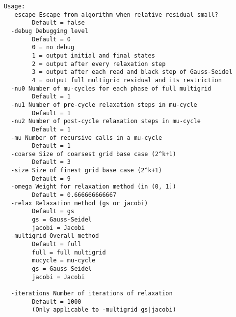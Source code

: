 \begin{verbatim}
Usage:
  -escape Escape from algorithm when relative residual small?
        Default = false
  -debug Debugging level
        Default = 0
        0 = no debug
        1 = output initial and final states
        2 = output after every relaxation step
        3 = output after each read and black step of Gauss-Seidel
        4 = output full multigrid residual and its restriction
  -nu0 Number of mu-cycles for each phase of full multigrid
        Default = 1
  -nu1 Number of pre-cycle relaxation steps in mu-cycle
        Default = 1
  -nu2 Number of post-cycle relaxation steps in mu-cycle
        Default = 1
  -mu Number of recursive calls in a mu-cycle
        Default = 1
  -coarse Size of coarsest grid base case (2^k+1)
        Default = 3
  -size Size of finest grid base case (2^k+1)
        Default = 9
  -omega Weight for relaxation method (in (0, 1])
        Default = 0.666666666667
  -relax Relaxation method (gs or jacobi)
        Default = gs
        gs = Gauss-Seidel
        jacobi = Jacobi
  -multigrid Overall method
        Default = full
        full = full multigrid
        mucycle = mu-cycle
        gs = Gauss-Seidel
        jacobi = Jacobi

  -iterations Number of iterations of relaxation
        Default = 1000
        (Only applicable to -multigrid gs|jacobi)
\end{verbatim}
